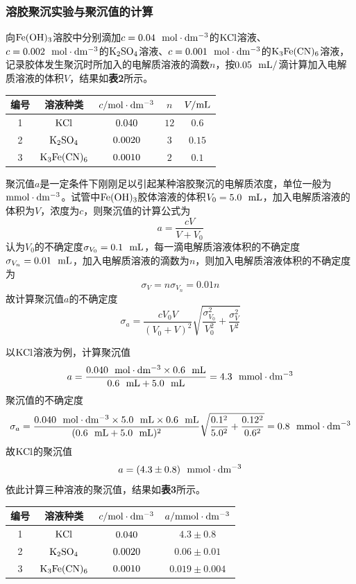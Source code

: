 \documentclass[12pt]{article}
\begin{document}
 
\subsubsection{溶胶聚沉实验与聚沉值的计算}
向$\rm Fe(OH)_{3}$溶胶中分别滴加$c=0.04\ \ {\rm mol\cdot dm^{-3}}$的$\rm KCl$溶液、$c=0.002\ \ {\rm mol\cdot dm^{-3}}$的$\rm K_{2}SO_{4}$溶液、$c=0.001\ \ {\rm mol\cdot dm^{-3}}$的$\rm K_{3}Fe(CN)_{6}$溶液，记录胶体发生聚沉时所加入的电解质溶液的滴数$n$，按$0.05\ \ {\rm mL/}$滴计算加入电解质溶液的体积$V$，结果如\textbf{表2}所示。
\begin{table}[h]
	\centering
	\begin{tabular}{ccccc}
		\toprule
		编号 & 溶液种类 & $c/{\rm mol\cdot dm^{-3}}$ & $n$ & $V/{\rm mL}$  \\
		\midrule
		1 & $\rm KCl$ & $\rm 0.040$ & $12$ & $0.6$  \\
		2 & $\rm K_{2}SO_{4}$ & $\rm 0.0020$ & $3$ & $0.15$  \\
		3 & $\rm K_{3}Fe(CN)_{6}$ & $\rm 0.0010$ & $2$ & $0.1$ \\
		\bottomrule
	\end{tabular}
\end{table}
\par
聚沉值$a$是一定条件下刚刚足以引起某种溶胶聚沉的电解质浓度，单位一般为$\rm mmol\cdot dm^{-3}$。试管中$\rm Fe(OH)_{3}$胶体溶液的体积$V_{0}={\rm 5.0\ \ mL}$，加入电解质溶液的体积为$V$，浓度为$c$，则聚沉值的计算公式为
$$
a=\frac{cV}{V+V_{0}}
$$
认为$V_{0}$的不确定度$\sigma_{V_{0}}=0.1\ \ {\rm mL}$，每一滴电解质溶液体积的不确定度$\sigma_{V_{n}}=0.01\ \ {\rm mL}$，加入电解质溶液的滴数为$n$，则加入电解质溶液体积的不确定度为
$$
\sigma_{V}=n\sigma_{V_{n}}=0.01n
$$
故计算聚沉值$a$的不确定度
$$
\sigma_{a}=\frac{cV_{0}V}{(V_{0}+V)^{2}}\sqrt{\dfrac{\sigma_{V_{0}}^{2}}{V_{0}^{2}}+\frac{\sigma_{V}^{2}}{V^{2}}}
$$
\par
以$\rm KCl$溶液为例，计算聚沉值
$$
a=\frac{0.040\ \ {\rm mol\cdot dm^{-3}}\times 0.6\ \ {\rm mL}}{0.6\ \ {\rm mL}+5.0\ \ {\rm mL}}=4.3\ \ {\rm mmol \cdot dm^{-3}}
$$
聚沉值的不确定度
$$
\sigma_{a}=\frac{0.040\ \ {\rm mol\cdot dm^{-3}}\times 5.0\ \ {\rm mL}\times 0.6\ \ {\rm mL}}{(0.6 \ \ {\rm mL}+5.0\ \ {\rm mL})^{2}}\sqrt{\frac{0.1^{2}}{5.0^{2}}+\frac{0.12^{2}}{0.6^{2}}}=0.8\ \ {\rm mmol\cdot dm^{-3}}
$$
故$\rm KCl$的聚沉值
$$
a=(4.3\pm 0.8)\ \ {\rm mmol\cdot dm^{-3}}
$$
依此计算三种溶液的聚沉值，结果如\textbf{表3}所示。
\begin{table}[h]
	\centering
	\begin{tabular}{cccc}
		\toprule
		编号 & 溶液种类 & $c/{\rm mol\cdot dm^{-3}}$ & $a/{\rm mmol\cdot dm^{-3}}$  \\
		\midrule
		1 & $\rm KCl$ & $\rm 0.040$ & $4.3\pm 0.8$  \\
		2 & $\rm K_{2}SO_{4}$ & $\rm 0.0020$ & $0.06\pm 0.01$  \\
		3 & $\rm K_{3}Fe(CN)_{6}$ & $\rm 0.0010$ & $0.019\pm 0.004$ \\
		\bottomrule
	\end{tabular}
\end{table}
\end{document}

